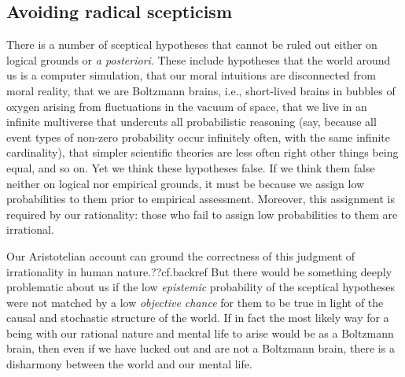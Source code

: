 \subsection{Avoiding radical scepticism}
There is a number of sceptical hypotheses that cannot be ruled out either on logical grounds
or \textit{a posteriori}. These include hypotheses that the world around us is a computer simulation, that our moral
intuitions are disconnected from moral reality, that we are Boltzmann brains, i.e., short-lived brains in bubbles of 
oxygen arising from fluctuations in the vacuum of space, that we live in an infinite multiverse that undercuts all
probabilistic reasoning (say, because all event types of non-zero probability occur infinitely often, with the same 
infinite cardinality), that simpler scientific theories are less often right other things being equal, and so 
on. Yet we think these hypotheses false. If we think them false neither on logical nor empirical grounds, it must be 
because we assign low probabilities to them prior to empirical assessment. Moreover, this assignment is required by 
our rationality: those who fail to assign low probabilities to them are irrational.

Our Aristotelian account can ground the correctness of this judgment of irrationality in human nature.??cf.backref 
But there would be something deeply problematic about us if the low \textit{epistemic} probability of the sceptical hypotheses 
were not matched by a low \textit{objective chance} for them to be true in light of the causal and stochastic structure of the world. 
If in fact the most likely way for a being with our rational nature and mental life to arise would be as a Boltzmann
brain, then even if we have lucked out and are not a Boltzmann brain, there is a disharmony between the world and our
mental life. 


